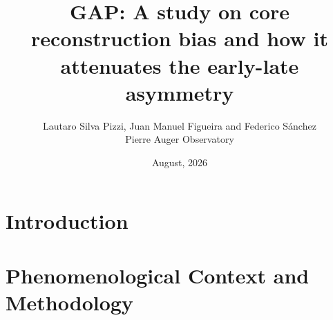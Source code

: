 \documentclass[11pt,a4paper]{article}
\title{GAP: A study on core reconstruction bias and how it attenuates the early-late asymmetry}
\author{Lautaro Silva Pizzi, Juan Manuel Figueira and Federico Sánchez \\ Pierre Auger Observatory}
\date{August, 2026}
\begin{document}
\maketitle

\begin{abstract}
\end{abstract}

\section{Introduction}
\label{sec:intro}



\section{Phenomenological Context and Methodology}
\label{sec:context_methodology}

\end{document}
